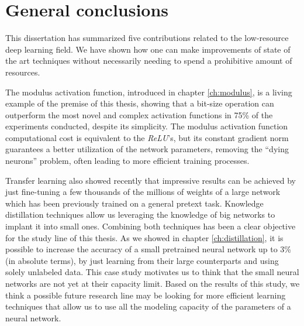 \chapter{General conclusions} \label{ch:conclusions}
This dissertation has summarized five contributions related to the low-resource deep learning field. We have shown how one can make improvements of state of the art techniques without necessarily needing to spend a prohibitive amount of resources. 

The modulus activation function, introduced in chapter \ref{ch:modulus}, is a living example of the premise of this thesis, showing that a bit-size operation can outperform the most novel and complex activation functions in 75\% of the experiments conducted, despite its simplicity. The modulus activation function computational cost is equivalent to the \textit{ReLU}'s, but its constant gradient norm guarantees a better utilization of the network parameters, removing the ``dying neurons'' problem, often leading to more efficient training processes.

Transfer learning also showed recently that impressive results can be achieved by just fine-tuning a few thousands of the millions of weights of a large network which has been previously trained on a general pretext task. Knowledge distillation techniques allow us leveraging the knowledge of big networks to implant it into small ones. Combining both techniques has been a clear objective for the study line of this thesis. As we showed in chapter \ref{ch:distillation}, it is possible to increase the accuracy of a small pretrained neural network up to 3\% (in absolute terms), by just learning from their large counterparts and using solely unlabeled data. This case study motivates us to think that the small neural networks are not yet at their capacity limit. Based on the results of this study, we think a possible future research line may be looking for more efficient learning techniques that allow us to use all the modeling capacity of the parameters of a neural network.

